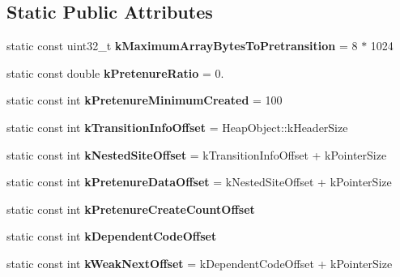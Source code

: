 \subsection*{Static Public Attributes}
\begin{DoxyCompactItemize}
\item 
static const uint32\+\_\+t {\bfseries k\+Maximum\+Array\+Bytes\+To\+Pretransition} = 8 $\ast$ 1024\hypertarget{classv8_1_1internal_1_1_allocation_site_aeead57f97b16bf614a5631349d0bc7f1}{}\label{classv8_1_1internal_1_1_allocation_site_aeead57f97b16bf614a5631349d0bc7f1}

\item 
static const double {\bfseries k\+Pretenure\+Ratio} = 0.\hypertarget{classv8_1_1internal_1_1_allocation_site_a45d58b4d64823e7d33eeb2291b26fb3a}{}\label{classv8_1_1internal_1_1_allocation_site_a45d58b4d64823e7d33eeb2291b26fb3a}

\item 
static const int {\bfseries k\+Pretenure\+Minimum\+Created} = 100\hypertarget{classv8_1_1internal_1_1_allocation_site_a60cc20b9d1f816783e6c112029776861}{}\label{classv8_1_1internal_1_1_allocation_site_a60cc20b9d1f816783e6c112029776861}

\item 
static const int {\bfseries k\+Transition\+Info\+Offset} = Heap\+Object\+::k\+Header\+Size\hypertarget{classv8_1_1internal_1_1_allocation_site_ab16a1b6151317cfa89ad5ff7d49f7f23}{}\label{classv8_1_1internal_1_1_allocation_site_ab16a1b6151317cfa89ad5ff7d49f7f23}

\item 
static const int {\bfseries k\+Nested\+Site\+Offset} = k\+Transition\+Info\+Offset + k\+Pointer\+Size\hypertarget{classv8_1_1internal_1_1_allocation_site_af3315748586cedda1896811766e0f944}{}\label{classv8_1_1internal_1_1_allocation_site_af3315748586cedda1896811766e0f944}

\item 
static const int {\bfseries k\+Pretenure\+Data\+Offset} = k\+Nested\+Site\+Offset + k\+Pointer\+Size\hypertarget{classv8_1_1internal_1_1_allocation_site_a1700918589b01582d697f3e1b4916e8b}{}\label{classv8_1_1internal_1_1_allocation_site_a1700918589b01582d697f3e1b4916e8b}

\item 
static const int {\bfseries k\+Pretenure\+Create\+Count\+Offset}
\item 
static const int {\bfseries k\+Dependent\+Code\+Offset}
\item 
static const int {\bfseries k\+Weak\+Next\+Offset} = k\+Dependent\+Code\+Offset + k\+Pointer\+Size\hypertarget{classv8_1_1internal_1_1_allocation_site_a455b0be20fe32fd7e81fcdc4ca510484}{}\label{classv8_1_1internal_1_1_allocation_site_a455b0be20fe32fd7e81fcdc4ca510484}


\end{DoxyCompactItemize}
